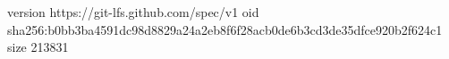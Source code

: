 version https://git-lfs.github.com/spec/v1
oid sha256:b0bb3ba4591dc98d8829a24a2eb8f6f28acb0de6b3cd3de35dfce920b2f624c1
size 213831

